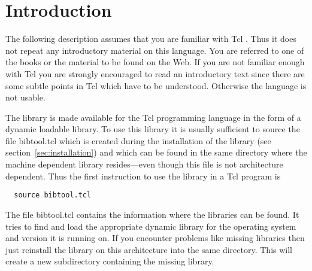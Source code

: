 
\newcommand\code[1]{\texttt{#1}}
\newcommand\meta[1]{\textit{#1\/}}
\newcommand\file[1]{\textsf{#1}}

\newcommand\TclSummaryLabel[1]{\textbf{#1\hss}}
\newcommand\TclSummary[3]{\TclSummaryOO{bibtool #1
    #2}{#3}\index{bibtool!#1}}
\newcommand\TclSummaryOO[2]{\begin{list}{}{%
      \parskip=0pt
      \parsep=0pt
      \topsep=0pt
      \rightmargin=2em
      \advance\leftmargin \rightmargin
      \let\makelabel\TclSummaryLabel}
  \item[#1] \ \par #2
  \end{list}}

\section{Introduction}

The following description assumes that you are familiar with Tcl
\cite{ousterhout:tcl,welch:practical}.  Thus it does not repeat any
introductory material on this language.  You are referred to one of
the books or the material to be found on the Web.  If you are not
familiar enough with Tcl you are strongly encouraged to read an
introductory text since there are some subtle points in Tcl which have
to be understood.  Otherwise the language is not usable.

The \BibTool{} library is made available for the Tcl programming
language in the form of a dynamic loadable library. To use this
library it is usually sufficient to source the file \file{bibtool.tcl}
which is created during the installation of the library (see
section~\ref{sec:installation}) and which can be found in the same
directory where the machine dependent library resides---even though
this file is not architecture dependent. Thus the first instruction to
use the library in a Tcl program is

\begin{verbatim}
  source bibtool.tcl
\end{verbatim}
The file \file{bibtool.tcl} contains the information where the
libraries can be found. It tries to find and load the appropriate
dynamic library for the operating system and version it is running on.
If you encounter problems like missing libraries then just reinstall
the \BibTool{} library on this architecture into the same directory.
This will create a new subdirectory containing the missing library.


